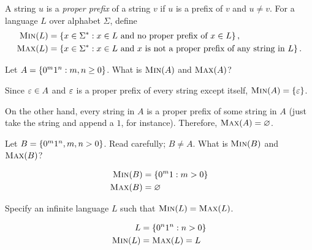 \begin{problem}
  A string $u$ is a \emph{proper prefix} of a string $v$ if $u$ is a prefix of $v$ and $u \neq v$.
  For a language $L$ over alphabet $\Sigma$, define
  \begin{align*}
    \textsc{Min}(L) &= \left\{x \in \Sigma^* : x \in L \text{ and no proper prefix of } x \in L\right\},\\
    \textsc{Max}(L) &= \left\{x \in \Sigma^* : x \in L \text{ and $x$ is not a proper prefix of any string in $L$}\right\}.
  \end{align*}

  \begin{enumalph}
    \item Let $A = \left\{0^m1^n : m, n \ge 0\right\}$. What is $\textsc{Min}(A)$ and $\textsc{Max}(A)$?
      \begin{Answer}
        Since $\varepsilon \in A$ and $\varepsilon$ is a proper prefix of every string except itself,
        $\textsc{Min}(A) = \left\{\varepsilon\right\}$.

        \step
        On the other hand, every string in $A$ is a proper prefix
        of some string in $A$ (just take the string and append a $1$, for instance).
        Therefore, $\textsc{Max}(A) = \varnothing$.
        
      \end{Answer}
    \item Let $B = \left\{0^m1^n, m, n > 0\right\}$. Read carefully; $B \neq A$. What is
    $\textsc{Min}(B)$ and $\textsc{Max}(B)$?
      \begin{Answer}
        \begin{align*}
          \textsc{Min}(B) &= \left\{0^m1 : m > 0\right\} \\
          \textsc{Max}(B) &= \varnothing
        \end{align*}
      \end{Answer}

    \item Specify an infinite language $L$ such that $\textsc{Min}(L) = \textsc{Max}(L)$.
      \begin{Answer}
        \begin{align*}
          L &= \left\{0^n1^n : n > 0 \right\}\\
          \textsc{Min}(L) &= \textsc{Max}(L) = L
        \end{align*}
      \end{Answer}
  \end{enumalph}
\end{problem}
